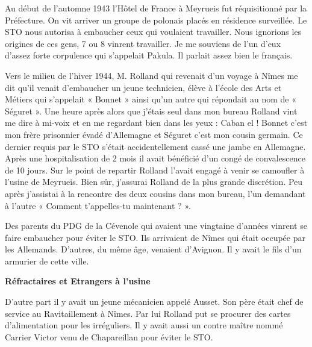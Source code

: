 \vspace{0.45cm}

Au début de l’automne 1943 l’Hôtel de France à Meyrueis fut réquisitionné par la Préfecture.
On vit arriver un groupe de polonais placés en résidence surveillée. Le STO nous autorisa à
embaucher ceux qui voulaient travailler. Nous ignorions les origines de ces gens, 7 ou 8
vinrent travailler. Je me souviens de l’un d’eux d’assez forte corpulence qui s’appelait Pakula.
Il parlait assez bien le français.

\vspace{0.45cm}

Vers le milieu de l’hiver 1944, M. Rolland qui revenait d’un voyage à Nîmes me dit qu’il
venait d’embaucher un jeune technicien, élève à l’école des Arts et Métiers qui s’appelait
« Bonnet » ainsi qu’un autre qui répondait au nom de « Séguret ». Une heure après alors que
j’étais seul dans mon bureau Rolland vint me dire à mi-voix et en me regardant bien dans les
yeux : Caban el ! Bonnet c’est mon frère prisonnier évadé d’Allemagne et Séguret c’est mon
cousin germain. Ce dernier requis par le STO s’était accidentellement cassé une jambe en
Allemagne. Après une hospitalisation de 2 mois il avait bénéficié d’un congé de
convalescence de 10 jours. Sur le point de repartir Rolland l’avait engagé à venir se camoufler
à l’usine de Meyrueis. Bien sûr, j’assurai Rolland de la plus grande discrétion. Peu après
j’assistai à la rencontre des deux cousins dans mon bureau, l’un demandant à l’autre
« Comment t’appelles-tu maintenant ? ».

\vspace{0.45cm}

Des parents du PDG de la Cévenole qui avaient une vingtaine d’années vinrent se faire
embaucher pour éviter le STO. Ils arrivaient de Nîmes qui était occupée par les Allemands.
D’autres, du même âge, venaient d’Avignon. Il y avait le fils d’un armurier de cette ville.

\vspace{0.55cm}

\textbf{Réfractaires et Etrangers à l’usine}

\vspace{0.35cm}

D’autre part il y avait un jeune mécanicien appelé Ausset. Son père était chef de service au
Ravitaillement à Nîmes. Par lui Rolland put se procurer des cartes d’alimentation pour les
irréguliers. Il y avait aussi un contre maître nommé Carrier Victor venu de Chapareillan pour
éviter le STO.

